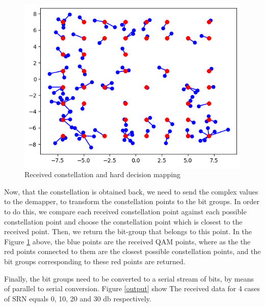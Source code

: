 \begin{figure}[htbp]
    \centering
    \includegraphics[width=\linewidth]{../Source/results/demapping}
    \caption{Received constellation and hard decision mapping}
    \label{received}
\end{figure}

Now, that the constellation is obtained back, we need to send the complex values to the demapper, to transform the constellation points to the bit groups. In order to do this, we compare each received constellation point against each possible constellation point and choose the constellation point which is closest to the received point. Then, we return the bit-group that belongs to this point. In the Figure \ref{received} above, the blue points are the received QAM points, where as the the red points connected to them are the closest possible constellation points, and the bit groups corresponding to these red points are returned.

Finally, the bit groups need to be converted to a serial stream of bits, by means of parallel to serial conversion. Figure \ref{output} show The received data for 4 cases of SRN equals 0, 10, 20 and 30 db respectively.

